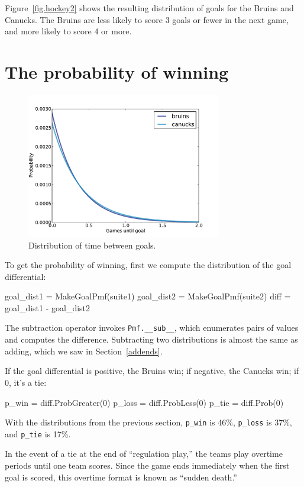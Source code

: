 \documentclass[12pt]{book}
\theoremstyle{exercise}
\begin{document}
Figure~\ref{fig.hockey2} shows the resulting distribution of goals for
the Bruins and Canucks.  The Bruins are less likely to
score 3 goals or fewer in the next game, and more likely to score 4 or
more.


\section{The probability of winning}

\begin{figure}
\centerline{\includegraphics[height=2.5in]{figs/hockey3.pdf}}
\caption{Distribution of time between goals.}
\label{fig.hockey3}
\end{figure}

To get the probability of winning, first we compute the
distribution of the goal differential:

\begin{code}
    goal_dist1 = MakeGoalPmf(suite1)
    goal_dist2 = MakeGoalPmf(suite2)
    diff = goal_dist1 - goal_dist2
\end{code}  

The subtraction operator invokes \verb"Pmf.__sub__", which enumerates
pairs of values and computes the difference.  Subtracting two
distributions is almost the same as adding, which we saw in
Section~\ref{addends}.

If the goal differential is positive, the Bruins win; if negative, the
Canucks win; if 0, it's a tie:

\begin{code}
    p_win = diff.ProbGreater(0)
    p_loss = diff.ProbLess(0)
    p_tie = diff.Prob(0)
\end{code}  

With the distributions from the previous section, \verb"p_win"
is 46\%, \verb"p_loss" is 37\%, and \verb"p_tie" is 17\%.

In the event of a tie at the end of ``regulation play,'' the teams play
overtime periods until one team scores.  Since the game ends
immediately when the first goal is scored, this overtime format
is known as ``sudden death.''
\end{document}
